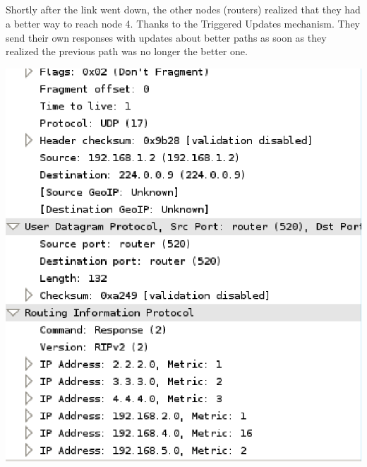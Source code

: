 \subsection{}
Shortly after the link went down, the other nodes (routers) realized that they had a better way to reach node 4.
Thanks to the Triggered Updates mechanism. They send their own responses with updates about better paths as soon
as they realized the previous path was no longer the better one.
\begin{center}
    \includegraphics[width=1 \textwidth]{resources/mn3.png}\centering
\end{center}
